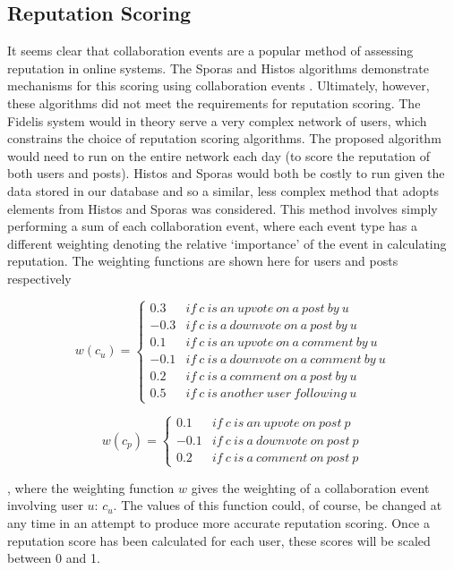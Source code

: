 \subsection{Reputation Scoring}
It seems clear that collaboration events are a popular method of assessing reputation in online systems. The Sporas and Histos algorithms demonstrate mechanisms for this scoring using collaboration events \cite{mcnally2013} \cite{zacharia2000}. Ultimately, however, these algorithms did not meet the requirements for reputation scoring. The Fidelis system would in theory serve a very complex network of users, which constrains the choice of reputation scoring algorithms. The proposed algorithm would need to run on the entire network each day (to score the reputation of both users and posts). Histos and Sporas would both be costly to run given the data stored in our database and so a similar, less complex method that adopts elements from Histos and Sporas was considered. This method involves simply performing a sum of each collaboration event, where each event type has a different weighting denoting the relative `importance' of the event in calculating reputation. The weighting functions are shown here for users and posts respectively

\begin{equation}
	\label{eq:rep_weight_user}
		w(c_u) = \left\{\begin{matrix}
			0.3 & if\ c\ is\ an\ upvote\ on\ a\ post\ by\ u\\ 
			-0.3 & if\ c\ is\ a\ downvote\ on\ a\ post\ by\ u \\ 
			0.1 & if\ c\ is\ an\ upvote\ on\ a\ comment\ by\ u \\ 
			-0.1 & if\ c\ is\ a\ downvote\ on\ a\ comment\ by\ u \\ 
			0.2 & if\ c\ is\ a\ comment\ on\ a\ post\ by\ u\\ 
			0.5 & if\ c\ is\ another\ user\ following\ u
		\end{matrix}\right.
\end{equation}
		
\begin{equation}
	\label{eq:rep_weight_post}
	 w(c_p) = \left\{\begin{matrix}
			0.1 & if\ c\ is\ an\ upvote\ on\ post\ p \\ 
			-0.1 & if\ c\ is\ a\ downvote\ on\ post\ p \\ 
			0.2 & if\ c\ is\ a\ comment\ on\ post\ p
	\end{matrix}\right.
\end{equation}

\noindent
, where the weighting function \(w\) gives the weighting of a collaboration event involving user \(u\): \(c_u\). The values of this function could, of course, be changed at any time in an attempt to produce more accurate reputation scoring. Once a reputation score has been calculated for each user, these scores will be scaled between 0 and 1.
